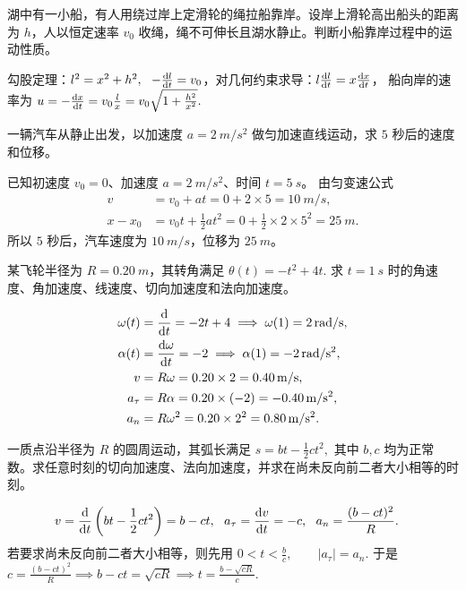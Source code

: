 \documentclass[lang=cn,11pt]{elegantbook}
\begin{document}
\begin{exercise}
湖中有一小船，有人用绕过岸上定滑轮的绳拉船靠岸。设岸上滑轮高出船头的距离为 \(h\)，人以恒定速率 \(v_0\) 收绳，绳不可伸长且湖水静止。判断小船靠岸过程中的运动性质。
\end{exercise}
\begin{solution}
勾股定理：$l^2=x^2+h^2,~~-\dv{l}{t}=v_0$，对几何约束求导：$l\dv{l}{t}=x\dv{x}{t}$，
船向岸的速率为
 \(u=-\dv{x}{t} =v_0\frac{l}{x} =v_0\sqrt{1+\frac{h^2}{x^2}}.\) 
\end{solution}

\begin{exercise}
一辆汽车从静止出发，以加速度 \(a=\SI{2}{m/s^2}\) 做匀加速直线运动，求 \(5\) 秒后的速度和位移。
\end{exercise}

\begin{solution}
已知初速度 \(v_0=0\)、加速度 \(a=\SI{2}{m/s^2}\)、时间 \(t=\SI{5}{s}\)。
由匀变速公式
\[
\begin{aligned}
v&=v_0+at=0+2\times 5=\SI{10}{m/s},\\
x-x_0&=v_0t+\frac{1}{2}at^2=0+\frac{1}{2}\times 2\times 5^2=\SI{25}{m}.
\end{aligned}
\]
所以 \(5\) 秒后，汽车速度为 \(\SI{10}{m/s}\)，位移为 \(\SI{25}{m}\)。
\end{solution}

\begin{exercise}
某飞轮半径为 \(R=\SI{0.20}{m}\)，其转角满足
 \(\theta(t)=-t^2+4t.\) 
求 \(t=\SI{1}{s}\) 时的角速度、角加速度、线速度、切向加速度和法向加速度。
\end{exercise}
\begin{solution}
\[
\begin{aligned}
\omega(t)&=\dv{}{t}(-t^2+4t)=-2t+4
\implies \omega(1)=\SI{2}{rad/s},\\
\alpha(t)&=\dv{\omega}{t}=-2
\implies \alpha(1)=\SI{-2}{rad/s^2},\\
v&=R\omega=0.20\times 2=\SI{0.40}{m/s},\\
a_\tau&=R\alpha=0.20\times(-2)=\SI{-0.40}{m/s^2},\\
a_n&=R\omega^2=0.20\times 2^2=\SI{0.80}{m/s^2}.
\end{aligned}
\]
\end{solution}

\begin{exercise}[已知弧长函数时怎样分出切向与法向加速度]
一质点沿半径为 \(R\) 的圆周运动，其弧长满足
 \(s=bt-\frac12 ct^2,\) 
其中 \(b,c\) 均为正常数。求任意时刻的切向加速度、法向加速度，并求在尚未反向前二者大小相等的时刻。
\end{exercise}
\begin{solution}
\[
\begin{aligned}
v&=\dv{}{t}\left(bt-\frac12 ct^2\right)=b-ct,~~a_\tau=\dv{v}{t}=-c,~~a_n=\frac{(b-ct)^2}{R}.
\end{aligned}
\]
若要求尚未反向前二者大小相等，则先用
 \(0<t<\frac{b}{c},\qquad |a_\tau|=a_n.\) 
于是
 \(c=\frac{(b-ct)^2}{R} \implies b-ct=\sqrt{cR} \implies t=\frac{b-\sqrt{cR}}{c}.\) 
\end{solution}
\end{document}
